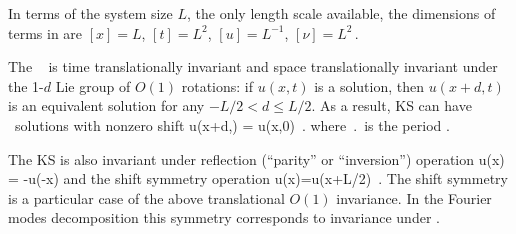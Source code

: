 In terms of the system size $L$, the only length scale available,
the dimensions of terms in  are
$ %
[x]=L
$, $%
[t]=L^2
$, $%
[u]=L^{-1}
$, $%
[\nu]=L^2
\,.
$ %

The \KSe\   is
time translationally invariant
and 
space translationally invariant
under the 1-$d$ Lie group of $O(1)$ rotations: if
$u(x,t)$ is a solution, then $u(x+d,t)$ is an equivalent
solution for any $-L/2 < d \leq L/2$.
As a result,
KS can have \rpo\ solutions with nonzero shift
\beq
u(x+d,\period{}) = u(x,0)
\,.
where $\period{}$ is the period  . 

The KS is also invariant under
reflection (``parity'' or ``inversion'') operation
\beq
\Refl u(x) = -u(-x)
and the shift symmetry operation 
\beq
\Shift u(x)=u(x+L/2)
\,. 
The shift symmetry is a particular case of the
above translational $O(1)$ invariance.
In the Fourier modes decomposition  this
symmetry corresponds to invariance under
.

